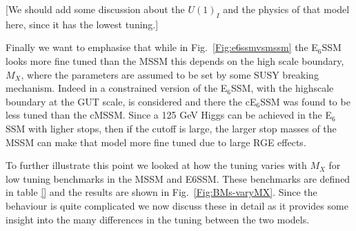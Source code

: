 \documentclass[preprint,amsmath,amssymb,aps,superscriptaddress,prd,showpacs,floatfix,nofootinbib]{revtex4-1}
\begin{document}
[We should add some discussion about the $U(1)_I$ and the physics of
  that model here, since it has the lowest tuning.]

Finally we want to emphasise that while in Fig.~\ref{Fig:e6ssmvsmssm}
the E$_6$SSM looks more fine tuned than the MSSM this depends on the
high scale boundary, $M_X$, where the parameters are assumed to be set
by some SUSY breaking mechanism.  Indeed in \cite{Athron:2013ipa} a
constrained version of the E$_6$SSM, with the highscale boundary at
the GUT scale, is considered and there the cE$_6$SSM was found to be
less tuned than the cMSSM. Since a 125 GeV Higgs can be achieved in
the E$_6$SSM with ligher stops, then if the cutoff is large, the
larger stop masses of the MSSM can make that model more fine tuned due
to large RGE effects.

To further illustrate this point we looked at how the tuning varies
with $M_X$ for low tuning benchmarks in the MSSM and E6SSM. These
benchmarks are defined in table \ref{} and the results are shown in
Fig.~\ref{Fig:BMs-varyMX}. Since the behaviour is quite complicated we
now discuss these in detail as it provides some insight into the many
differences in the tuning between the two models.
\end{document}
